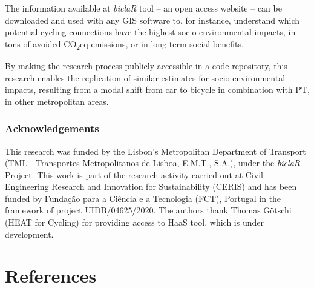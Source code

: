 \documentclass[runningheads]{llncs}
\begin{document}
The information available at \emph{biclaR} tool -- an open access
website -- can be downloaded and used with any GIS software to, for
instance, understand which potential cycling connections have the
highest socio-environmental impacts, in tons of avoided
CO\textsubscript{2}eq emissions, or in long term social benefits.

By making the research process publicly accessible in a code repository,
this research enables the replication of similar estimates for
socio-environmental impacts, resulting from a modal shift from car to
bicycle in combination with PT, in other metropolitan areas.

\hypertarget{acknowledgements}{%
\subsubsection*{Acknowledgements}\label{acknowledgements}}

This research was funded by the Lisbon's Metropolitan Department of
Transport (TML - Transportes Metropolitanos de Lisboa, E.M.T., S.A.),
under the \emph{biclaR} Project. This work is part of the research
activity carried out at Civil Engineering Research and Innovation for
Sustainability (CERIS) and has been funded by Fundação para a Ciência e
a Tecnologia (FCT), Portugal in the framework of project
UIDB/04625/2020. The authors thank Thomas Götschi (HEAT for Cycling) for
providing access to HaaS tool, which is under development.

\hypertarget{references}{%
\section*{References}\label{references}}
\end{document}
